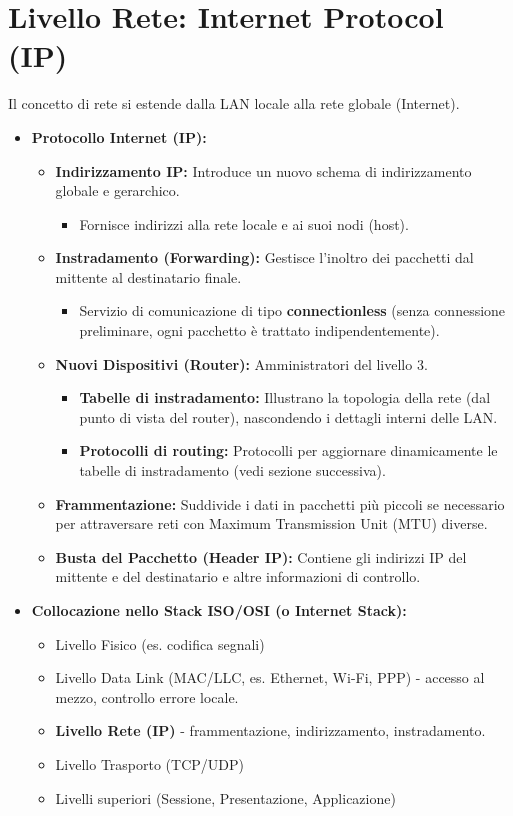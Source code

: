 \documentclass{article}
\begin{document}
\section{Livello Rete: Internet Protocol (IP)}
Il concetto di rete si estende dalla LAN locale alla rete globale (Internet).
\begin{itemize}
    \item \textbf{Protocollo Internet (IP):}
    \begin{itemize}
        \item \textbf{Indirizzamento IP:} Introduce un nuovo schema di indirizzamento globale e gerarchico.
        \begin{itemize}
            \item Fornisce indirizzi alla rete locale e ai suoi nodi (host).
        \end{itemize}
        \item \textbf{Instradamento (Forwarding):} Gestisce l'inoltro dei pacchetti dal mittente al destinatario finale.
        \begin{itemize}
            \item Servizio di comunicazione di tipo \textbf{connectionless} (senza connessione preliminare, ogni pacchetto è trattato indipendentemente).
        \end{itemize}
        \item \textbf{Nuovi Dispositivi (Router):} Amministratori del livello 3.
        \begin{itemize}
            \item \textbf{Tabelle di instradamento:} Illustrano la topologia della rete (dal punto di vista del router), nascondendo i dettagli interni delle LAN.
            \item \textbf{Protocolli di routing:} Protocolli per aggiornare dinamicamente le tabelle di instradamento (vedi sezione successiva).
        \end{itemize}
        \item \textbf{Frammentazione:} Suddivide i dati in pacchetti più piccoli se necessario per attraversare reti con Maximum Transmission Unit (MTU) diverse.
        \item \textbf{Busta del Pacchetto (Header IP):} Contiene gli indirizzi IP del mittente e del destinatario e altre informazioni di controllo.
    \end{itemize}
    \item \textbf{Collocazione nello Stack ISO/OSI (o Internet Stack):}
    \begin{itemize}
        \item Livello Fisico (es. codifica segnali)
        \item Livello Data Link (MAC/LLC, es. Ethernet, Wi-Fi, PPP) - accesso al mezzo, controllo errore locale.
        \item \textbf{Livello Rete (IP)} - frammentazione, indirizzamento, instradamento.
        \item Livello Trasporto (TCP/UDP)
        \item Livelli superiori (Sessione, Presentazione, Applicazione)
    \end{itemize}
\end{itemize}
\end{document}
